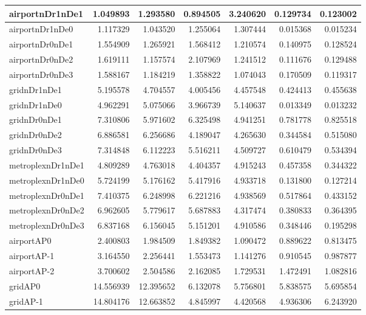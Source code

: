 \begin{longtable}{|l|r|r|r|r|r|r|}
\endlastfoot
airportnDr1nDe1 & 1.049893 & 1.293580 & 0.894505 & 3.240620 & 0.129734 & 0.123002 \\ \hline
airportnDr1nDe0 & 1.117329 & 1.043520 & 1.255064 & 1.307444 & 0.015368 & 0.015234 \\ \hline
airportnDr0nDe1 & 1.554909 & 1.265921 & 1.568412 & 1.210574 & 0.140975 & 0.128524 \\ \hline
airportnDr0nDe2 & 1.619111 & 1.157574 & 2.107969 & 1.241512 & 0.111676 & 0.129488 \\ \hline
airportnDr0nDe3 & 1.588167 & 1.184219 & 1.358822 & 1.074043 & 0.170509 & 0.119317 \\ \hline
gridnDr1nDe1 & 5.195578 & 4.704557 & 4.005456 & 4.457548 & 0.424413 & 0.455638 \\ \hline
gridnDr1nDe0 & 4.962291 & 5.075066 & 3.966739 & 5.140637 & 0.013349 & 0.013232 \\ \hline
gridnDr0nDe1 & 7.310806 & 5.971602 & 6.325498 & 4.941251 & 0.781778 & 0.825518 \\ \hline
gridnDr0nDe2 & 6.886581 & 6.256686 & 4.189047 & 4.265630 & 0.344584 & 0.515080 \\ \hline
gridnDr0nDe3 & 7.314848 & 6.112223 & 5.516211 & 4.509727 & 0.610479 & 0.534394 \\ \hline
metroplexnDr1nDe1 & 4.809289 & 4.763018 & 4.404357 & 4.915243 & 0.457358 & 0.344322 \\ \hline
metroplexnDr1nDe0 & 5.724199 & 5.176162 & 5.417916 & 4.933718 & 0.131800 & 0.127214 \\ \hline
metroplexnDr0nDe1 & 7.410375 & 6.248998 & 6.221216 & 4.938569 & 0.517864 & 0.433152 \\ \hline
metroplexnDr0nDe2 & 6.962605 & 5.779617 & 5.687883 & 4.317474 & 0.380833 & 0.364395 \\ \hline
metroplexnDr0nDe3 & 6.837168 & 6.156045 & 5.151201 & 4.910586 & 0.348446 & 0.195298 \\ \hline
airportAP0 & 2.400803 & 1.984509 & 1.849382 & 1.090472 & 0.889622 & 0.813475 \\ \hline
airportAP-1 & 3.164550 & 2.256441 & 1.553473 & 1.141276 & 0.910545 & 0.987877 \\ \hline
airportAP-2 & 3.700602 & 2.504586 & 2.162085 & 1.729531 & 1.472491 & 1.082816 \\ \hline
gridAP0 & 14.556939 & 12.395652 & 6.132078 & 5.756801 & 5.838575 & 5.695854 \\ \hline
gridAP-1 & 14.804176 & 12.663852 & 4.845997 & 4.420568 & 4.936306 & 6.243920 \\ \hline

\end{longtable}
